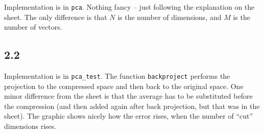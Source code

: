 \documentclass[a4paper]{article}
\begin{document}
Implementation is in \texttt{pca}. Nothing fancy -- just following the
explanation on the sheet. The only difference is that $ N $ is the number of
dimensions, and $ M $ is the number of vectors.

\subsection*{2.2}

Implementation is in \texttt{pca\_test}. The function \texttt{backproject}
performs the projection to the compressed space and then back to the original
space. One minor difference from the sheet is that the average has to be
substituted before the compression (and then added again after back projection,
but that was in the sheet). The graphic shows nicely how the error rises, when
the number of ``cut'' dimensions rises.
\end{document}
